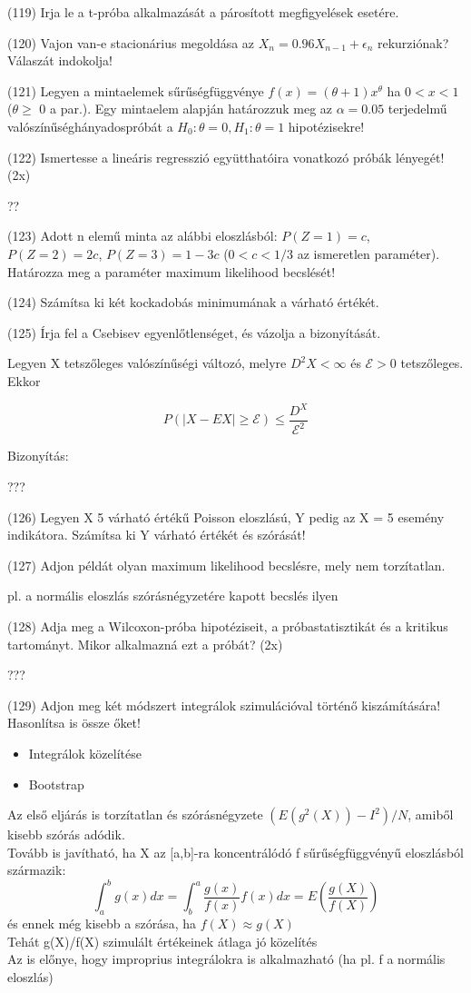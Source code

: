 \documentclass[12p]{article}
\begin{document}
(119) Irja le a t-próba alkalmazását a párosított megfigyelések esetére.

(120) Vajon van-e stacionárius megoldása az $X_n = 0.96 X_{n-1} + \epsilon_n$ rekurziónak? Válaszát
indokolja!

(121) Legyen a mintaelemek sűrűségfüggvénye $f(x) = (\theta + 1)x^{\theta}$ ha $0 < x < 1$ ($\theta \geq$ 0 a par.).
Egy mintaelem alapján határozzuk meg az $\alpha = 0.05$ terjedelmű valószínűséghányadospróbát a $H_0 : \theta = 0, H_1 : \theta = 1$ hipotézisekre!

(122) Ismertesse a lineáris regresszió együtthatóira vonatkozó próbák lényegét! (2x)

??

(123) Adott n elemű minta az alábbi eloszlásból: $P(Z = 1) = c$, $P(Z = 2) = 2c$, $P(Z = 3) = 1 - 3c$ ($0 < c < 1/3$ az ismeretlen paraméter). Határozza meg a paraméter maximum likelihood becslését!

(124) Számítsa ki két kockadobás minimumának a várható értékét.

(125) Írja fel a Csebisev egyenlőtlenséget, és vázolja a bizonyítását.

Legyen X tetszőleges valószínűségi változó, melyre $D^2X < \infty$ és $\mathcal{E} > 0$ tetszőleges. Ekkor

$$P(|X - EX| \geq \mathcal{E}) \leq \frac{D^X}{\mathcal{E}^2}$$

Bizonyítás:

???

(126) Legyen X 5 várható értékű Poisson eloszlású, Y pedig az X = 5 esemény indikátora. Számítsa ki Y várható értékét és szórását!

(127) Adjon példát olyan maximum likelihood becslésre, mely nem torzítatlan.

pl. a normális eloszlás szórásnégyzetére kapott becslés ilyen

(128) Adja meg a Wilcoxon-próba hipotéziseit, a próbastatisztikát és a kritikus tartományt.
Mikor alkalmazná ezt a próbát? (2x)

???

(129) Adjon meg két módszert integrálok szimulációval történő kiszámítására! Hasonlítsa is
össze őket!

\begin{itemize}
\item Integrálok közelítése
\item Bootstrap
\end{itemize}

Az első eljárás is torzítatlan és szórásnégyzete $(E(g^2(X)) - I^2) / N$, amiből kisebb szórás adódik.\\
Tovább is javítható, ha X az [a,b]-ra koncentrálódó f sűrűségfüggvényű eloszlásból származik:
$$\int^b_a g(x)dx = \int^a_b \frac{g(x)}{f(x)} f(x)dx = E (\frac{g(X)}{f(X)})$$
és ennek még kisebb a szórása, ha $f(X) \approx g(X)$\\
Tehát g(X)/f(X) szimulált értékeinek átlaga jó közelítés\\
Az is előnye, hogy improprius integrálokra is alkalmazható (ha pl. f a normális eloszlás)
\end{document}

